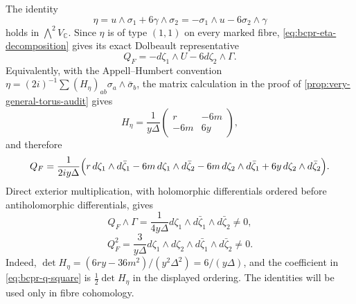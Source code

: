 The identity
\begin{equation}
 \eta=u\wedge\sigma_1+6\gamma\wedge\sigma_2
     =-\sigma_1\wedge u-6\sigma_2\wedge\gamma
\label{eq:bcpr-eta-decomposition}
\end{equation}
holds in $\bigwedge^2V_{\mathbb C}$.  Since $\eta$ is of type $(1,1)$
on every marked fibre, \cref{eq:bcpr-eta-decomposition} gives its exact
Dolbeault representative
\begin{equation}
 Q_F=-d\zeta_1\wedge U-6d\zeta_2\wedge\Gamma.
\label{eq:bcpr-q-fibre}
\end{equation}
Equivalently, with the Appell--Humbert convention
$\eta=(2i)^{-1}\sum(H_\eta)_{ab}\sigma_a\wedge\bar\sigma_b$, the matrix
calculation in the proof of \cref{prop:very-general-torus-audit} gives
\begin{equation}
 H_\eta=\frac1{y\Delta}
 \begin{pmatrix}r&-6m\\-6m&6y\end{pmatrix},
\label{eq:bcpr-appell-humbert-matrix}
\end{equation}
and therefore
\begin{equation}
 Q_F=\frac1{2iy\Delta}\Bigl(
 r\,d\zeta_1\wedge d\bar\zeta_1
 -6m\,d\zeta_1\wedge d\bar\zeta_2
 -6m\,d\zeta_2\wedge d\bar\zeta_1
 +6y\,d\zeta_2\wedge d\bar\zeta_2\Bigr).
\label{eq:bcpr-q-fibre-expanded}
\end{equation}
Direct exterior multiplication, with holomorphic differentials ordered
before antiholomorphic differentials, gives
\begin{equation}
 Q_F\wedge\Gamma
 =\frac1{4y\Delta}
 d\zeta_1\wedge d\bar\zeta_1\wedge d\bar\zeta_2\neq0,
\label{eq:bcpr-q-gamma-product}
\end{equation}
\begin{equation}
 Q_F^2
 =\frac3{y\Delta}
 d\zeta_1\wedge d\zeta_2\wedge
 d\bar\zeta_1\wedge d\bar\zeta_2\neq0.
\label{eq:bcpr-q-square}
\end{equation}
Indeed,
$\det H_\eta=(6ry-36m^2)/(y^2\Delta^2)=6/(y\Delta)$,
and the coefficient in \cref{eq:bcpr-q-square} is
$\tfrac12\det H_\eta$ in the displayed ordering.  The identities
 will be used only in
fibre cohomology.


